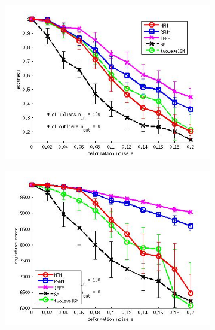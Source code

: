 \documentclass[
	fontsize=12pt,
	paper=a4,
	twoside=false,
	numbers=noenddot,
	plainheadsepline,
	toc=listof,
	toc=bibliography
]{scrartcl}
\begin{document}
\begin{figure}[h] 
	\begin{subfigure}[b]{0.3\textwidth}
		\centering
		\includegraphics[scale=0.25]{"fig_ver2608/syntheticPointSets/ver4.3.2/deformation/accuracy_avg10t"} 
	\end{subfigure}%
	\begin{subfigure}[b]{0.3\textwidth}
		\centering
		\includegraphics[scale=0.25]{"fig_ver2608/syntheticPointSets/ver4.3.2/deformation/score_avg10t"} 
	\end{subfigure} 
	\begin{subfigure}[b]{0.3\textwidth}
		\centering

\end{subfigure}
\end{figure}
\end{document}
